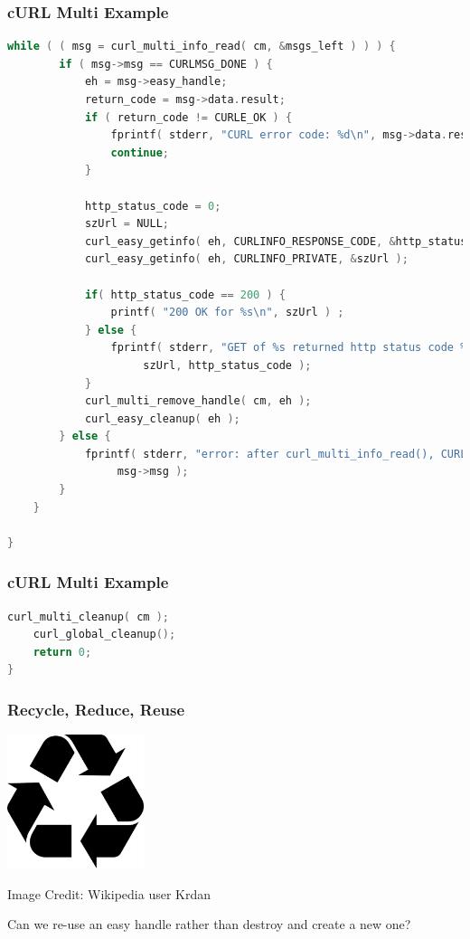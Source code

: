 \begin{frame}[fragile]
	\frametitle{cURL Multi Example}

	\begin{lstlisting}[language=C]
    while ( ( msg = curl_multi_info_read( cm, &msgs_left ) ) ) {
        if ( msg->msg == CURLMSG_DONE ) {
            eh = msg->easy_handle;
            return_code = msg->data.result;
            if ( return_code != CURLE_OK ) {
                fprintf( stderr, "CURL error code: %d\n", msg->data.result );
                continue;
            }

            http_status_code = 0;
            szUrl = NULL;
            curl_easy_getinfo( eh, CURLINFO_RESPONSE_CODE, &http_status_code );
            curl_easy_getinfo( eh, CURLINFO_PRIVATE, &szUrl );

            if( http_status_code == 200 ) {
                printf( "200 OK for %s\n", szUrl ) ;
            } else {
                fprintf( stderr, "GET of %s returned http status code %d\n",
                     szUrl, http_status_code );
            }
            curl_multi_remove_handle( cm, eh );
            curl_easy_cleanup( eh );
        } else {
            fprintf( stderr, "error: after curl_multi_info_read(), CURLMsg=%d\n",
                 msg->msg );
        }
    }

}
\end{lstlisting}

\end{frame}

\begin{frame}[fragile]
	\frametitle{cURL Multi Example}

	\begin{lstlisting}[language=C]
    curl_multi_cleanup( cm );
    curl_global_cleanup();
    return 0;
}
\end{lstlisting}

\end{frame}

\begin{frame}
	\frametitle{Recycle, Reduce, Reuse}

	\begin{center}
		\includegraphics[width=0.3\textwidth]{images/recycle.png}
	\end{center}
	\hfill Image Credit: Wikipedia user Krdan

	Can we re-use an easy handle rather than destroy and create a new one?

\end{frame}

